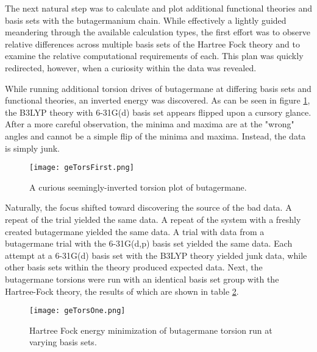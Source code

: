 The next natural step was to calculate and plot additional functional theories and basis sets with the butagermanium chain. 
While effectively a lightly guided meandering through the available calculation types, the first effort was to observe relative differences across multiple basis sets of the Hartree Fock theory and to examine the relative computational requirements of each.
This plan was quickly redirected, however, when a curiosity within the data was revealed.

While running additional torsion drives of butagermane at differing basis sets and functional theories, an inverted energy was discovered. 
As can be seen in figure \ref{fig:geTorsFirst}, the B3LYP theory with 6-31G(d) basis set appears flipped upon a cursory glance. 
After a more careful observation, the minima and maxima are at the "wrong" angles and cannot be a simple flip of the minima and maxima.
Instead, the data is simply junk.

\begin{figure}
	
	\centering
	
	\texttt{[image: geTorsFirst.png]}
	
	\caption{A curious seemingly-inverted torsion plot of butagermane.}
	
	\label{fig:geTorsFirst}
	
\end{figure}

Naturally, the focus shifted toward discovering the source of the bad data.
A repeat of the trial yielded the same data.
A repeat of the system with a freshly created butagermane yielded the same data.
A trial with data from a butagermane trial with the 6-31G(d,p) basis set yielded the same data.
Each attempt at a 6-31G(d) basis set with the B3LYP theory yielded junk data, while other basis sets within the theory produced expected data. 
Next, the butagermane torsions were run with an identical basis set group with the Hartree-Fock theory, the results of which are shown in table \ref{fig:geTorsOne}.

\begin{figure}
	
	\centering
	
	\texttt{[image: geTorsOne.png]}
	
	\caption{Hartree Fock energy minimization of butagermane torsion run at varying basis sets.}
	
	\label{fig:geTorsOne}
	
\end{figure}

